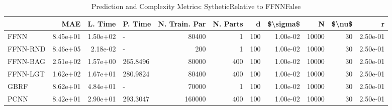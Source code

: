 \begin{table}
\centering
\caption{Prediction and Complexity Metrics: SytheticRelative to FFNNFalse}
\label{tab__Sythetic__Fix_Neurons_QTrue}
\begin{tabular}{lrrlrrrrrrr}
\toprule
{} &      MAE &  L. Time &   P. Time &  N. Train. Par &  N. Parts &    d &  \$\textbackslash sigma\$ &      N &  \$\textbackslash nu\$ &        r \\
\midrule
FFNN     & 8.45e+01 & 1.50e+02 &         - &          80400 &         1 &  100 &  1.00e-02 &  10000 &     30 & 2.50e-01 \\
FFNN-RND & 8.46e+05 & 2.18e-02 &         - &            200 &         1 &  100 &  1.00e-02 &  10000 &     30 & 2.50e-01 \\
FFNN-BAG & 2.51e+02 & 1.57e+00 &  265.8496 &          80000 &       400 &  100 &  1.00e-02 &  10000 &     30 & 2.50e-01 \\
FFNN-LGT & 1.62e+02 & 1.67e+01 &  280.9824 &          80400 &       400 &  100 &  1.00e-02 &  10000 &     30 & 2.50e-01 \\
GBRF     & 8.62e+01 & 4.84e+01 &         - &          70000 &         1 &  100 &  1.00e-02 &  10000 &     30 & 2.50e-01 \\
PCNN     & 8.42e+01 & 2.90e+01 &  293.3047 &         160000 &       400 &  100 &  1.00e-02 &  10000 &     30 & 2.50e-01 \\
\bottomrule
\end{tabular}
\end{table}
